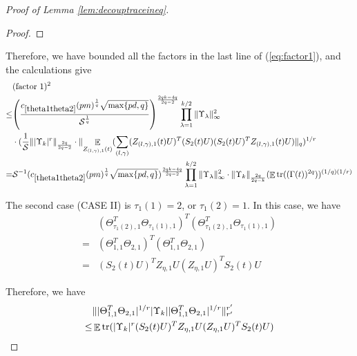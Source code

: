 \documentclass[11pt]{amsart}
\numberwithin{equation}{section}
\numberwithin{equation}{section}
\DeclareMathOperator{\E}{\mathbb{E}}
\DeclareMathOperator*{\tr}{tr}
\newcommand{\cS}{\mathcal{S}}
\DeclarePairedDelimiter{\norm}{\lVert}{\rVert}
\DeclarePairedDelimiter{\paren}{(}{)}
\theoremstyle{remark}
\theoremstyle{definition}
\begin{document}
\begin{proof}[Proof of Lemma \ref{lem:decouptraceineq}]
\begin{proof}
\end{proof}












Therefore, we have bounded all the factors in the last line of (\ref{eq:factor1}), and the calculations give
\begin{align*}
    &(\text{factor 1})^2
 \\ \le &\paren*{\frac{c_{\ref*{theta1theta2}}(pm)^{\frac{1}{q}}\sqrt{\max \{ pd, q \}}}{\cS^\frac{1}{q}}}^{\frac{2qk-4q}{2q-2}}\prod\limits_{\lambda  = 1}^{k/2} {\norm{\Upsilon_\lambda }_{\infty}^2} \\ &\cdot (\frac{1}{\cS} \norm{|\Upsilon_k|^{r}}_{\frac{2q}{2q-2}} \cdot \norm{\E_{Z_{(l,\gamma),1}(t)}(\sum_{(l,\gamma)}(Z_{(l,\gamma),1}(t)U)^T(S_2(t)U)(S_2(t)U )^TZ_{(l,\gamma),1}(t)U)}_{q})^{1/r}
\\=&\cS^{-1}(c_{\ref*{theta1theta2}}(pm)^{\frac{1}{q}} \sqrt{\max\{pd,q\}})^{\frac{2qk-4q}{2q-2}}\prod\limits_{\lambda  = 1}^{k/2} {\norm{\Upsilon_\lambda }_{\infty}^2} \cdot \norm{\Upsilon_k}_{\frac{2q}{2q-k}}(\E \tr((\Gamma(t))^{2q}))^{(1/q)(1/r)}
\end{align*}



The second case (CASE II) is $\tau_1(1)=2$, or $\tau_1(2)=1$. In this case, we have
\begin{align*}
   & (\Theta_{\tau_{1}(2),1}^T\Theta_{\tau_{1}(1),1})^T (\Theta_{\tau_{1}(2),1}^T\Theta_{\tau_{1}(1),1})\\=&(\Theta_{1,1}^T\Theta_{2,1})^T (\Theta_{1,1}^T\Theta_{2,1})\\=&(S_2(t)U)^T Z_{\eta,1}U (Z_{\eta,1}U)^TS_2(t)U
\end{align*}

Therefore, we have
\begin{align*}
    &\norm{| \Theta_{1,1}^T\Theta_{2,1}|^{1/r} |\Upsilon_k| | \Theta_{1,1}^T\Theta_{2,1}|^{1/r}}_{r'}^{r'} \\ \le  & \E\tr( |\Upsilon_k|^{r}  (S_2(t)U)^T Z_{\eta,1}U (Z_{\eta,1}U)^TS_2(t)U )
    \end{align*}


\end{proof}
\end{document}
